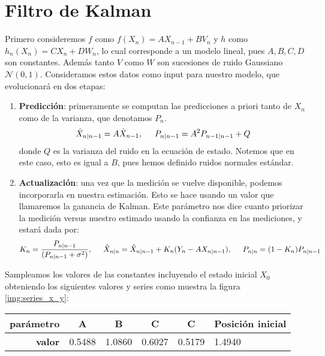\documentclass[letterpaper,11pt,oneside]{article}
\begin{document}

\section{Filtro de Kalman}

Primero consideremos $f$ como $ f(X_n) = A X_{n-1} + B V_n$ y $h$ como $ h_n(X_n) = C X_n + DW_n$, lo cual corresponde a un modelo lineal, pues $A,B,C,D$ son constantes. Además tanto $V$ como $W$ son sucesiones de ruido Gaussiano $\mathcal{N}(0,1)$. Consideramos estos datos como input para nuestro modelo, que evolucionará en dos etapas:
\begin{enumerate}
    \item \textbf{Predicción}: primeramente se computan las predicciones a priori tanto de $X_n$ como de la varianza, que denotamos $P_n$.
    $$ \hat X_{n|n-1} = A \hat X_{n-1},\hspace{.5cm} P_{n|n-1} = A^2 P_{n-1|n-1} + Q$$
    donde $Q$ es la varianza del ruido en la ecuación de estado. Notemos que en este caso, esto es igual a $B$, pues hemos definido ruidos normales estándar.
    \item \textbf{Actualización}: una vez que la medición se vuelve disponible, podemos incorporarla en nuestra estimación. Esto se hace usando un valor que llamaremos la ganancia de Kalman. Este parámetro nos dice cuanto priorizar la medición versus nuestro estimado usando la confianza en las mediciones, y estará dada por:
    $$ K_n = \frac{P_{n|n-1}}{(P_{n|n-1}+\sigma^2)},\hspace{.5cm} \hat X_{n|n}=\hat X_{n|n-1}+K_n(Y_n-AX_{n|n-1}),\hspace{.5cm} P_{n|n}=(1-K_n)P_{n|n-1}$$
\end{enumerate}


Sampleamos los valores de las constantes incluyendo el estado inicial $X_0$ obteniendo los siguientes valores y series como muestra la figura \ref{img:series_x_y}:

\begin{table}
\begin{tabular}{|c|c|c|l|l|l|}
\hline
\textbf{parámetro}                   & \textbf{A}                  & \textbf{B}                  & \multicolumn{1}{c|}{\textbf{C}} & \multicolumn{1}{c|}{\textbf{C}} & \multicolumn{1}{c|}{\textbf{Posición inicial}} \\ \hline
\multicolumn{1}{|r|}{\textbf{valor}} & \multicolumn{1}{r|}{0.5488} & \multicolumn{1}{r|}{1.0860} & 0.6027                          & 0.5179                          & 1.4940                                         \\ \hline
\end{tabular}
\end{table}
\end{document}
